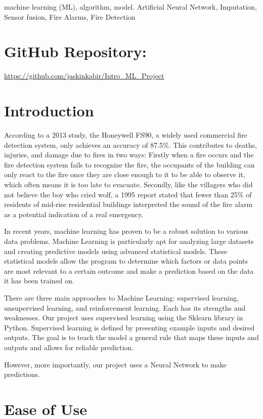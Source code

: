 \documentclass[conference]{IEEEtran}
\begin{document}
\begin{IEEEkeywords}
machine learning (ML), algorithm, model. Artificial Neural Network, Imputation, Sensor fusion, Fire Alarms, Fire Detection
\end{IEEEkeywords}

\section{GitHub Repository:}
\centering
\url{https://github.com/jaskinkabir/Intro_ML_Project}

\section{Introduction}
According to a 2013 study, the Honeywell FS90, a widely used
commercial fire detection system, only achieves an accuracy
of 87.5\%\cite{smokeacc}. This contributes to deaths,
injuries, and damage due to fires in two ways: Firstly when
a fire occurs and the fire detection system fails to
recognize the fire, the occupants of the building can only
react to the fire once they are close enough to it to be
able to observe it, which often means it is too late to
evacuate. Secondly, like the villagers who did not believe
the boy who cried wolf, a 1995 report stated that fewer than
25\% of residents of mid-rise residential buildings
interpreted the sound of the fire alarm as a potential
indication of a real emergency\cite{crywolf}.

In recent years, machine learning has proven to be a robust solution to various data problems. Machine Learning is particularly apt for analyzing large datasets and creating predictive models using advanced statistical models. These statistical models allow the program to determine which factors or data points are most relevant to a certain outcome and make a prediction based on the data it has been trained on. 

There are three main approaches to Machine Learning: supervised learning, unsupervised learning, and reinforcement learning. Each has its strengths and weaknesses. Our project uses supervised learning using the Sklearn library in Python. Supervised learning is defined by presenting example inputs and desired outputs. The goal is to teach the model a general rule that maps these inputs and outputs and allows for reliable prediction. 

However, more importantly, our project uses a Neural Network to make predictions.

\section{Ease of Use}
\end{document}
